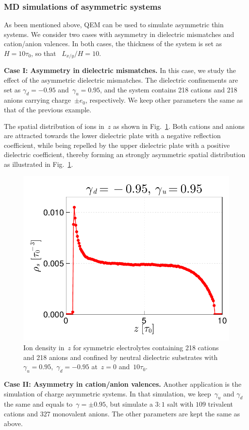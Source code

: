 \subsubsection{MD simulations of asymmetric systems}
As been mentioned above, QEM can be used to simulate asymmetric thin systems.
We consider two cases with asymmetry in dielectric mismatches and cation/anion valences.
In both cases, the thickness of the system is set as~$H = 10 \tau_0$, so that ~$L_{x/y} / H = 10$.

\textbf{Case I: Asymmetry in dielectric mismatches.}
In this case, we study the effect of the asymmetric dielectric mismatches.
The dielectric confinements are set as $\gamma_d = -0.95$ and~$\gamma_u = 0.95$, and the system contains 218 cations and 218 anions carrying charge~$\pm e_0$, respectively.
We keep other parameters the same as that of the previous example.

The spatial distribution of ions in~$z$ as shown in Fig.~\ref{fig:non_sym}.
Both cations and anions are attracted towards the lower dielectric plate with a negative reflection coefficient, while being repelled by the upper dielectric plate with a positive dielectric coefficient, thereby forming an strongly asymmetric spatial distribution as illustrated in Fig.~\ref{fig:non_sym}.

\begin{figure}[htbp]
    \centering
    \includegraphics[width = 0.50\linewidth]{figs/non_symm.pdf}
    \caption{
        Ion density in~$z$ for symmetric electrolytes containing 218 cations and 218 anions and confined by neutral dielectric substrates with $\gamma_u = 0.95$,~$\gamma_d = -0.95$ at~$z = 0$ and~$10\tau_0$.
    }
    \label{fig:non_sym}
\end{figure}

\textbf{Case II: Asymmetry in cation/anion valences.}
Another application is the simulation of charge asymmetric systems.
In that simulation, we keep~$\gamma_u$ and $\gamma_d$ the same and equals to~$\gamma = \pm 0.95$, but simulate a $3:1$ salt with $109$ trivalent cations and $327$ monovalent anions. 
The other parameters are kept the same as above.

